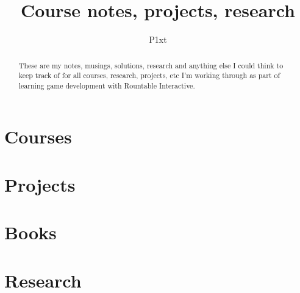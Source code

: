 \documentclass[alpha-refs]{wiley-article}
\title{Course notes, projects, research}
\author[1\authfn{1}]{P1xt}
\affil[1]{https://github.com/P1xt}
\begin{document}
\maketitle

\begin{abstract}
These are my notes, musings, solutions, research and anything else I could think to keep track of for all courses, research, projects, etc I'm working through as part of learning game development with Rountable Interactive.

\end{abstract}
\newpage

\tableofcontents
\newpage

\part{Courses}
\newpage

\newpage

\newpage
\part{Projects}
\newpage

\newpage
\part{Books}
\newpage

\newpage

\newpage
\part{Research}
\end{document}
